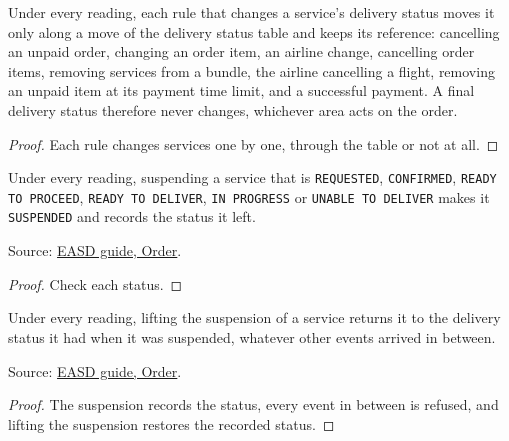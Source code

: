 \begin{theorem}
  \label{thm:delivery-moves-across-areas}
  Under every reading, each rule that changes a service's delivery status
  moves it only along a move of the delivery status table and keeps its
  reference: cancelling an unpaid order, changing an order item, an airline
  change, cancelling order items, removing services from a bundle, the
  airline cancelling a flight, removing an unpaid item at its payment time
  limit, and a successful payment.  A final delivery status therefore never
  changes, whichever area acts on the order.
\end{theorem}
\begin{proof}
  Each rule changes services one by one, through the table or not at all.
\end{proof}

\begin{theorem}
  \label{thm:delivery-suspend}
  Under every reading, suspending a service that is \texttt{REQUESTED},
  \texttt{CONFIRMED}, \texttt{READY TO PROCEED}, \texttt{READY TO DELIVER},
  \texttt{IN PROGRESS} or \texttt{UNABLE TO DELIVER} makes it
  \texttt{SUSPENDED} and records the status it left.

  Source: \href{https://standards.atlassian.net/wiki/spaces/EASD/pages/574849062/Order}{EASD guide, Order}.
\end{theorem}
\begin{proof}
  Check each status.
\end{proof}

\begin{theorem}
  \label{thm:delivery-resume}
  Under every reading, lifting the suspension of a service returns it to the
  delivery status it had when it was suspended, whatever other events
  arrived in between.

  Source: \href{https://standards.atlassian.net/wiki/spaces/EASD/pages/574849062/Order}{EASD guide, Order}.
\end{theorem}
\begin{proof}
  The suspension records the status, every event in between is refused,
  and lifting the suspension restores the recorded status.
\end{proof}

